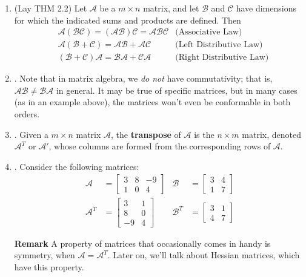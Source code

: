 \documentclass[12pt]{article}
\begin{document}
\begin{enumerate}
\begin{enumerate}
	\item\underline{} (Lay THM 2.2)
		Let $\mathcal{A}$ be a $m\times n$ matrix, and let $\mathcal{B}$ and $\mathcal{C}$ have dimensions for which the indicated sums and products are defined. Then
		\begin{align*}
			&\mathcal{A(BC) = (AB)C = ABC}	&\text{(Associative Law)}			\\
			&\mathcal{A(B+C) = AB+AC}		&\text{(Left Distributive Law)}		\\
			&\mathcal{(B+C)A = BA+CA}		&\text{(Right Distributive Law)}	
		\end{align*}

	\item\underline{}.
		Note that in matrix algebra, we \emph{do not} have commutativity; that is, $\mathcal{AB\neq BA}$ in general.
		It may be true of specific matrices, but in many cases (as in an example above), the matrices won't
		even be conformable in both orders.

	\item\underline{}.
		Given a $m\times n$ matrix $\mathcal{A}$, the \textbf{transpose} of $\mathcal{A}$ is the $n\times m$ matrix, denoted $\mathcal{A}^T$ or $\mathcal{A}'$, whose columns are formed from the corresponding rows of $\mathcal{A}$.

	\item\underline{}.
		Consider the following matrices:
			\begin{align*}
				\mathcal{A}	& = \begin{bmatrix}3 & 8 & -9 \\ 1 & 0 & 4\end{bmatrix}
				&\mathcal{B} & = \begin{bmatrix}3 & 4 \\ 1 & 7\end{bmatrix} \\[10pt]
				\mathcal{A}^T & = \begin{bmatrix}3 & 1 \\  8 & 0 \\ -9 & 4\end{bmatrix}
					&\mathcal{B}^T &= \begin{bmatrix}3 & 1 \\ 4 & 7\end{bmatrix}
			\end{align*}
	
	\textbf{Remark}
		A property of matrices that occasionally comes in handy is symmetry, when $\mathcal{A = A}^T$. Later on, we'll talk about Hessian matrices, which have this property.


\end{enumerate}
\end{enumerate}
\end{document}
